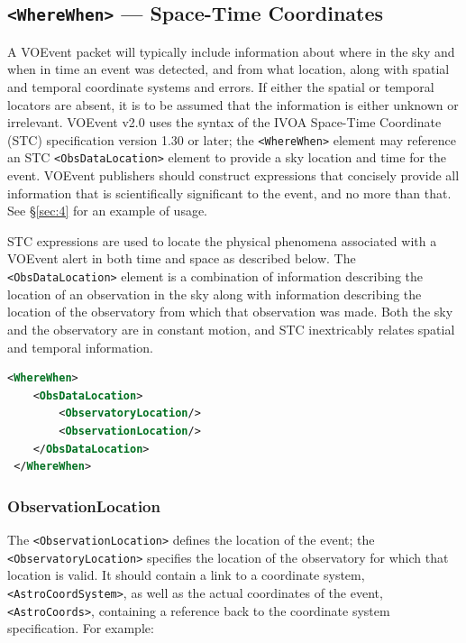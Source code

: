 \documentclass[11pt,a4paper]{ivoa}
\begin{document}
\subsection{{\tt <WhereWhen>} --- Space-Time Coordinates}
\label{sec:3.4}

A VOEvent packet will typically include information about where in the sky and 
when in time an event was detected, and from what location, along with spatial 
and temporal coordinate systems and errors. If either the spatial or temporal 
locators are absent, it is to be assumed that the information is either unknown 
or irrelevant. VOEvent v2.0 uses the syntax of the IVOA Space-Time Coordinate 
(STC) specification version 1.30 or later; the {\tt <WhereWhen>} element may 
reference an STC \citep{2007ivoa.spec.1030R} {\tt <ObsDataLocation>} element to 
provide a sky location and time for the event. VOEvent publishers should 
construct expressions that concisely provide all information that is 
scientifically significant to the event, and no more than that. See 
\S\ref{sec:4} for an example of usage. 

STC expressions are used to locate the physical phenomena associated with a 
VOEvent alert in both time and space as described below. The {\tt 
<ObsDataLocation>} element is a combination of information describing the 
location of an observation in the sky along with information describing the 
location of the observatory from which that observation was made. Both the sky 
and the observatory are in constant motion, and STC inextricably relates spatial 
and temporal information. 

\begin{lstlisting}[language=XML]
<WhereWhen>
    <ObsDataLocation>
        <ObservatoryLocation/>
        <ObservationLocation/>
    </ObsDataLocation>
 </WhereWhen>
\end{lstlisting}

\subsubsection{ObservationLocation}
\label{sec:3.4.1}

The {\tt <ObservationLocation>} defines the location of the event; the {\tt 
<ObservatoryLocation>} specifies the location of the observatory for which that 
location is valid. It should contain a link to a coordinate system, {\tt 
<AstroCoordSystem>}, as well as the actual coordinates of the event, {\tt 
<AstroCoords>}, containing a reference back to the coordinate system 
specification. For example: 
\end{document}
